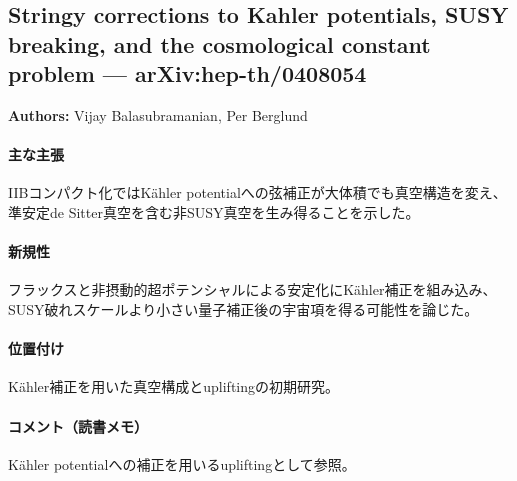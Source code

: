 \subsection{Stringy corrections to Kahler potentials, SUSY breaking, and the cosmological constant problem --- arXiv:hep-th/0408054}

\textbf{Authors:} Vijay Balasubramanian, Per Berglund

\paragraph{主な主張}
IIBコンパクト化ではK\"ahler potentialへの弦補正が大体積でも真空構造を変え、準安定de Sitter真空を含む非SUSY真空を生み得ることを示した\cite{Balasubramanian:2004uy}。

\paragraph{新規性}
フラックスと非摂動的超ポテンシャルによる安定化にK\"ahler補正を組み込み、SUSY破れスケールより小さい量子補正後の宇宙項を得る可能性を論じた。

\paragraph{位置付け}
K\"ahler補正を用いた真空構成とupliftingの初期研究。

\paragraph{コメント（読書メモ）}
K\"ahler potentialへの補正を用いるupliftingとして参照。
